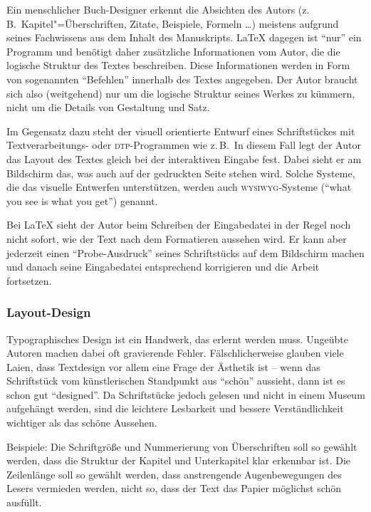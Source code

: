 Ein menschlicher Buch-Designer erkennt die Absichten des Autors
(z.\,B.\ Kapitel"=Überschriften, Zitate, Beispiele, Formeln
\dots) meistens aufgrund seines Fachwissens aus dem Inhalt des
Manuskripts.  \LaTeX{} dagegen ist \enquote{nur} ein Programm und
benötigt daher zusätzliche Informationen vom Autor, die die
logische Struktur des Textes beschreiben.
Diese Informationen werden in Form von sogenannten \enquote{Befehlen}
innerhalb des Textes angegeben.
Der Autor braucht sich also
(weitgehend) nur um die logische Struktur seines Werkes zu kümmern,
nicht um die Details von Gestaltung und Satz.
 
Im Gegensatz dazu steht der visuell orientierte Entwurf eines
Schriftstückes mit Textverarbeitungs- oder \textsc{dtp}-Programmen wie z.\,B.\ 
In diesem Fall legt der Autor das Layout des Textes gleich bei der
interaktiven Eingabe fest. Dabei sieht er am Bildschirm das, was
auch auf der gedruckten Seite stehen wird. Solche Systeme, die das
visuelle Entwerfen unterstützen, werden auch \textsc{wysiwyg}-Systeme
(\enquote{what you see is what you get}) genannt.
 
Bei \LaTeX{} sieht der Autor beim Schreiben der Eingabedatei in
der Regel noch nicht sofort, wie der Text nach dem Formatieren 
aussehen wird. Er kann aber %
jederzeit einen \enquote{Probe-Ausdruck} seines Schriftstücks auf dem
Bildschirm machen und danach seine Eingabedatei entsprechend 
korrigieren und die Arbeit fortsetzen.
 
 
\subsubsection{Layout-Design}
 
Typographisches Design ist ein Handwerk, das erlernt werden muss.
Ungeübte Autoren machen dabei oft gravierende Fehler.
Fälschlicherweise glauben viele Laien, dass Textdesign
vor allem eine Frage der Ästhetik ist -- wenn das
Schriftstück vom künstlerischen Standpunkt aus \enquote{schön}
aussieht, dann ist es schon gut \enquote{designed}.
Da Schriftstücke jedoch gelesen und nicht in einem Museum
aufgehängt werden, sind die leichtere Lesbarkeit und bessere
Verständlichkeit wichtiger als das schöne Aussehen.
 
Beispiele:
Die Schriftgröße und Nummerierung von Überschriften soll so
gewählt werden, dass die Struktur der Kapitel und Unterkapitel
klar erkennbar ist.
Die Zeilenlänge soll so gewählt werden, dass anstrengende
Augenbewegungen des Lesers vermieden werden, nicht so, dass der
Text das Papier möglichst schön ausfüllt.
 
